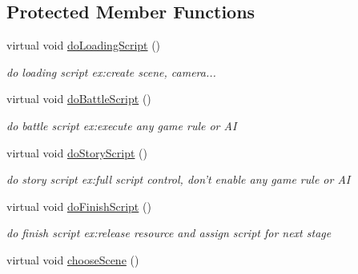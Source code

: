 \subsection*{Protected Member Functions}
\begin{DoxyCompactItemize}
\item 
\hypertarget{class_introduction_a5eb5a0fb3774cfe4cc8918aee49a7f5a}{
virtual void \hyperlink{class_introduction_a5eb5a0fb3774cfe4cc8918aee49a7f5a}{doLoadingScript} ()}
\label{class_introduction_a5eb5a0fb3774cfe4cc8918aee49a7f5a}

\begin{DoxyCompactList}\small\item\em do loading script ex:create scene, camera... \end{DoxyCompactList}\item 
\hypertarget{class_introduction_ae990ec1192659a649973290cc781ddaa}{
virtual void \hyperlink{class_introduction_ae990ec1192659a649973290cc781ddaa}{doBattleScript} ()}
\label{class_introduction_ae990ec1192659a649973290cc781ddaa}

\begin{DoxyCompactList}\small\item\em do battle script ex:execute any game rule or AI \end{DoxyCompactList}\item 
\hypertarget{class_introduction_aacfa29455d5a0075b789995e2dc7f245}{
virtual void \hyperlink{class_introduction_aacfa29455d5a0075b789995e2dc7f245}{doStoryScript} ()}
\label{class_introduction_aacfa29455d5a0075b789995e2dc7f245}

\begin{DoxyCompactList}\small\item\em do story script ex:full script control, don't enable any game rule or AI \end{DoxyCompactList}\item 
\hypertarget{class_introduction_ab881dab4eb5572c490f300779788d1a5}{
virtual void \hyperlink{class_introduction_ab881dab4eb5572c490f300779788d1a5}{doFinishScript} ()}
\label{class_introduction_ab881dab4eb5572c490f300779788d1a5}

\begin{DoxyCompactList}\small\item\em do finish script ex:release resource and assign script for next stage \end{DoxyCompactList}\item 
\hypertarget{class_introduction_a72ffc901a41d393c97fd8f8ecd520b7d}{
virtual void \hyperlink{class_introduction_a72ffc901a41d393c97fd8f8ecd520b7d}{chooseScene} ()}
\label{class_introduction_a72ffc901a41d393c97fd8f8ecd520b7d}


\end{DoxyCompactItemize}
